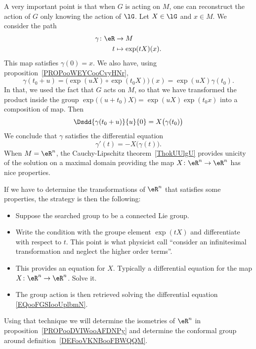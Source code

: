\begin{theorem}
A very important point\cite{ooOLNIooDLmxkR} is that when \( G\) is acting on $M$, one can reconstruct the action of \( G\) only knowing the action of \( \lG\). Let \( X\in \lG\) and \( x\in M\). We consider the path
\begin{equation}
	\begin{aligned}
		\gamma\colon \eR & \to M                \\
		t                & \mapsto \exp(tX)(x).
	\end{aligned}
\end{equation}
This map satisfies \( \gamma(0)=x\). We also have, using proposition~\ref{PROPooWEYCooCvyHNr},
\begin{equation}
	\gamma(t_0+u)=\big( \exp(uX)\circ\exp(t_0X)\big)(x)=\exp(uX)\gamma(t_0).
\end{equation}
In that, we used the fact that \( G\) acts on \( M\), so that we have transformed the product inside the group \( \exp\big( (u+t_0)X \big)= \exp(uX)\exp(t_0x) \) into a composition of map.  Then
\begin{equation}
	\Dsdd{ \gamma(t_0+u) }{u}{0}=X\big( \gamma(t_0) \big)
\end{equation}
We conclude that \( \gamma\) satisfies the differential equation
\begin{equation}        \label{EQooFGSIooUplbmN}
	\gamma'(t)=-X\big( \gamma(t) \big).
\end{equation}
When \( M=\eR^n\), the Cauchy-Lipschitz theorem~\ref{ThokUUlgU} provides unicity of the solution on a maximal domain providing the map \( X\colon \eR^n\to \eR^n\) has nice properties.

\begin{normaltext}      \label{NORMooMGAUooIoLtjW}
	If we have to determine the transformations of \( \eR^n\) that satisfies some properties, the strategy is then the following:
	\begin{itemize}
		\item Suppose the searched group to be a connected Lie group.
		\item Write the condition with the groupe element \( \exp(tX)\) and differentiate with respect to \( t\). This point is what physicist call ``consider an infinitesimal transformation and neglect the higher order terms''.
		\item This provides an equation for \( X\). Typically a differential equation for the map \( X\colon \eR^n\to \eR^n\). Solve it.
		\item The group action is then retrieved solving the differential equation \eqref{EQooFGSIooUplbmN}.
	\end{itemize}
	Using that technique we will determine the isometries of \( \eR^n\) in proposition~\ref{PROPooDVIWooAFDNPy} and determine the conformal group around definition~\ref{DEFooVKNBooFBWQQM}.  %
\end{normaltext}


\end{theorem}
